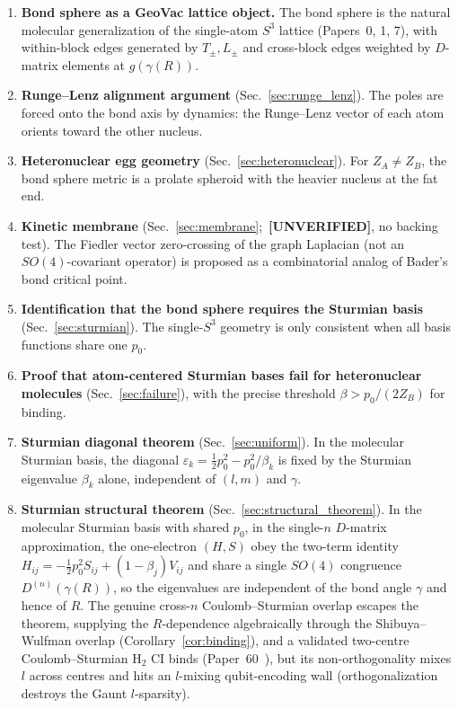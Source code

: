 \documentclass[aps,pra,twocolumn,superscriptaddress,longbibliography]{revtex4-2}
\theoremstyle{remark}
\theoremstyle{plain}
\begin{document}
\begin{enumerate}

\item \textbf{Bond sphere as a GeoVac lattice object.}  The bond
sphere is the natural molecular generalization of the single-atom
$S^3$ lattice (Papers~0, 1, 7), with within-block edges generated by
$T_\pm, L_\pm$ and cross-block edges weighted by $D$-matrix elements
at $g(\gamma(R))$.

\item \textbf{Runge--Lenz alignment argument}
(Sec.~\ref{sec:runge_lenz}).  The poles are forced onto the bond axis
by dynamics: the Runge--Lenz vector of each atom orients toward the
other nucleus.

\item \textbf{Heteronuclear egg geometry}
(Sec.~\ref{sec:heteronuclear}).  For $Z_A \neq Z_B$, the bond sphere
metric is a prolate spheroid with the heavier nucleus at the fat end.

\item \textbf{Kinetic membrane} (Sec.~\ref{sec:membrane};\
\textbf{[UNVERIFIED]}, no backing test).  The Fiedler vector
zero-crossing of the graph Laplacian (not an $SO(4)$-covariant operator)
is proposed as a combinatorial analog of Bader's bond critical point.

\item \textbf{Identification that the bond sphere requires the
Sturmian basis} (Sec.~\ref{sec:sturmian}).  The single-$S^3$ geometry
is only consistent when all basis functions share one $p_0$.

\item \textbf{Proof that atom-centered Sturmian bases fail for
heteronuclear molecules} (Sec.~\ref{sec:failure}), with the precise
threshold $\beta > p_0/(2Z_B)$ for binding.

\item \textbf{Sturmian diagonal theorem}
(Sec.~\ref{sec:uniform}).  In the molecular Sturmian basis, the diagonal
$\varepsilon_k = \tfrac{1}{2}p_0^2 - p_0^2/\beta_k$ is fixed by the Sturmian
eigenvalue $\beta_k$ alone, independent of $(l,m)$ and $\gamma$.

\item \textbf{Sturmian structural theorem}
(Sec.~\ref{sec:structural_theorem}).  In the molecular Sturmian basis
with shared $p_0$, in the single-$n$ $D$-matrix approximation, the
one-electron $(H,S)$ obey the two-term identity
$H_{ij} = -\tfrac12 p_0^2 S_{ij} + (1-\beta_j)V_{ij}$ and share a single
$SO(4)$ congruence $D^{(n)}(\gamma(R))$, so the eigenvalues are independent
of the bond angle $\gamma$ and hence of $R$.  The genuine cross-$n$
Coulomb--Sturmian overlap escapes the theorem, supplying the
$R$-dependence algebraically through the Shibuya--Wulfman overlap
(Corollary~\ref{cor:binding}), and a validated two-centre
Coulomb--Sturmian H$_2$ CI binds (Paper~60~\cite{loutey_paper60}), but its
non-orthogonality mixes $l$ across
centres and hits an $l$-mixing qubit-encoding wall (orthogonalization
destroys the Gaunt $l$-sparsity).


\end{enumerate}
\end{document}
